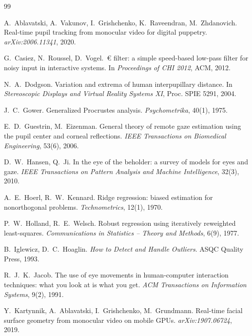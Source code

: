 \begin{thebibliography}{99}

A.~Ablavatski, A.~Vakunov, I.~Grishchenko, K.~Raveendran, M.~Zhdanovich.
\newblock Real-time pupil tracking from monocular video for digital puppetry.
\newblock \emph{arXiv:2006.11341}, 2020.

G.~Casiez, N.~Roussel, D.~Vogel.
\,€ filter: a simple speed-based low-pass filter for noisy input in interactive systems.
\newblock In \emph{Proceedings of CHI 2012}, ACM, 2012.

N.~A.~Dodgson.
\newblock Variation and extrema of human interpupillary distance.
\newblock In \emph{Stereoscopic Displays and Virtual Reality Systems XI}, Proc. SPIE 5291, 2004.

J.~C.~Gower.
\newblock Generalized Procrustes analysis.
\newblock \emph{Psychometrika}, 40(1), 1975.

E.~D.~Guestrin, M.~Eizenman.
\newblock General theory of remote gaze estimation using the pupil center and corneal reflections.
\newblock \emph{IEEE Transactions on Biomedical Engineering}, 53(6), 2006.

D.~W.~Hansen, Q.~Ji.
\newblock In the eye of the beholder: a survey of models for eyes and gaze.
\newblock \emph{IEEE Transactions on Pattern Analysis and Machine Intelligence}, 32(3), 2010.

A.~E.~Hoerl, R.~W.~Kennard.
\newblock Ridge regression: biased estimation for nonorthogonal problems.
\newblock \emph{Technometrics}, 12(1), 1970.

P.~W.~Holland, R.~E.~Welsch.
\newblock Robust regression using iteratively reweighted least-squares.
\newblock \emph{Communications in Statistics -- Theory and Methods}, 6(9), 1977.

B.~Iglewicz, D.~C.~Hoaglin.
\newblock \emph{How to Detect and Handle Outliers}.
\newblock ASQC Quality Press, 1993.

R.~J.~K.~Jacob.
\newblock The use of eye movements in human-computer interaction techniques: what you look at is what you get.
\newblock \emph{ACM Transactions on Information Systems}, 9(2), 1991.

Y.~Kartynnik, A.~Ablavatski, I.~Grishchenko, M.~Grundmann.
\newblock Real-time facial surface geometry from monocular video on mobile GPUs.
\newblock \emph{arXiv:1907.06724}, 2019.


\end{thebibliography}

